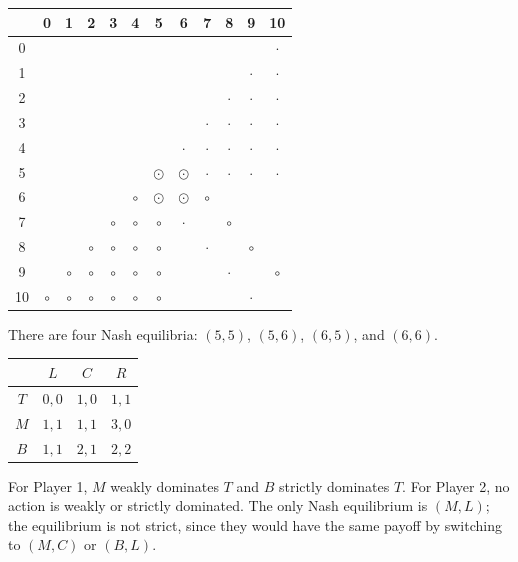 \documentclass{article}
\begin{document}
\begin{center}
    \begin{tabular}{|c|ccccccccccc|}
        \hline
        & 0 & 1 & 2 & 3 & 4 & 5 & 6 & 7 & 8 & 9 & 10 \\
        \hline
        0 & & & & & & & & & & & $\cdot$ \\
        1 & & & & & & & & & & $\cdot$ & $\cdot$ \\
        2 & & & & & & & & & $\cdot$ & $\cdot$ & $\cdot$ \\
        3 & & & & & & & & $\cdot$ & $\cdot$ & $\cdot$ & $\cdot$ \\
        4 & & & & & & & $\cdot$ & $\cdot$ & $\cdot$ & $\cdot$ & $\cdot$ \\
        5 & & & & & & $\odot$ & $\odot$ & $\cdot$ & $\cdot$ & $\cdot$ & $\cdot$ \\
        6 & & & & & $\circ$ & $\odot$ & $\odot$ & $\circ$ & & & \\
        7 & & & & $\circ$ & $\circ$ & $\circ$ & $\cdot$ & & $\circ$ & & \\
        8 & & & $\circ$ & $\circ$ & $\circ$ & $\circ$ & & $\cdot$ & & $\circ$ & \\
        9 & & $\circ$ & $\circ$ & $\circ$ & $\circ$ & $\circ$ & & & $\cdot$ & & $\circ$ \\
        10 & $\circ$ & $\circ$ & $\circ$ & $\circ$ & $\circ$ & $\circ$ & & & & $\cdot$ & \\
        \hline
    \end{tabular}
\end{center}
There are four Nash equilibria: $(5, 5)$, $(5, 6)$, $(6, 5)$, and $(6, 6)$.

\clearpage
\problem{}
\begin{center}
    \begin{tabular}{|c|c|c|c|}
        \hline
        & $L$ & $C$ & $R$ \\
        \hline
        $T$ & $0, 0$ & $1, 0$ & $1, 1$ \\
        \hline
        $M$ & $1, 1$ & $1, 1$ & $3, 0$ \\
        \hline
        $B$ & $1, 1$ & $2, 1$ & $2, 2$ \\
        \hline
    \end{tabular}
\end{center}
For Player 1, $M$ weakly dominates $T$ and $B$ strictly dominates $T$. For Player 2, no action is weakly or strictly dominated. The only Nash equilibrium is $(M, L)$; the equilibrium is not strict, since they would have the same payoff by switching to $(M, C)$ or $(B, L)$.
\end{document}
